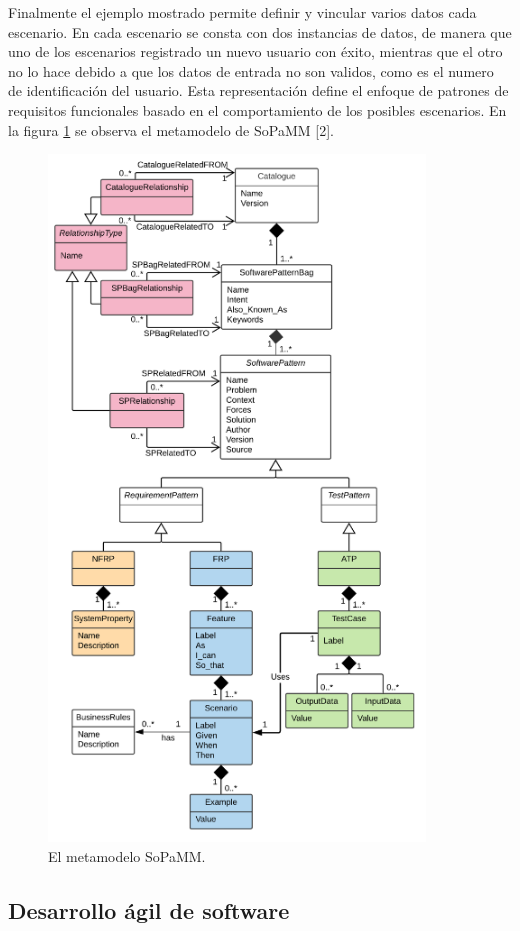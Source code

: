 Finalmente el ejemplo mostrado permite definir y vincular varios datos cada escenario. En cada escenario se consta con dos instancias de datos, de manera que uno de los escenarios registrado un nuevo usuario con éxito, mientras que el otro no lo hace debido a que los datos de entrada no son validos, como es el numero de identificación del usuario. Esta representación define el enfoque de patrones de requisitos funcionales basado en el comportamiento de los posibles escenarios. En la figura \ref{fig:metamodelo_sopamm} se observa el metamodelo de SoPaMM [2].

\begin{figure}[h!]
	\centering
	\includegraphics[width=10cm]{img/metamodelosopamm.png}
	\caption{El metamodelo SoPaMM.}
	\label{fig:metamodelo_sopamm}
\end{figure}


\subsection{Desarrollo ágil de software}

